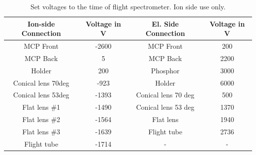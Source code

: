 \begin{table}
\centering
\begin{tabular}{ | c | c || c | c | }
\hline
	\textbf{Ion-side Connection} & \textbf{Voltage in V} & \textbf{El. Side Connection} & \textbf{Voltage in V} \\ \hline
	MCP Front & -2600 & MCP Front & 200 \\ \hline
	MCP Back & 5 & MCP Back & 2200 \\ \hline
	Holder & 200 & Phosphor & 3000 \\ \hline
	Conical lens 70deg & -923 & Holder & 6000 \\ \hline
	Conical lens 53deg & -1393 & Conical lens 70 deg & 500 \\ \hline
	Flat lens \#1 & -1490 & Conical lens 53 deg & 1370 \\ \hline
	Flat lens \#2 & -1564 & Flat lens & 1940 \\ \hline
	Flat lens \#3 & -1639 & Flight tube & 2736 \\ \hline
	Flight tube & -1714 & - & - \\ \hline
\end{tabular}
\caption{Set voltages to the time of flight spectrometer. Ion side use only.}
\label{tab:tof-volategs}
\end{table}
%
%
%